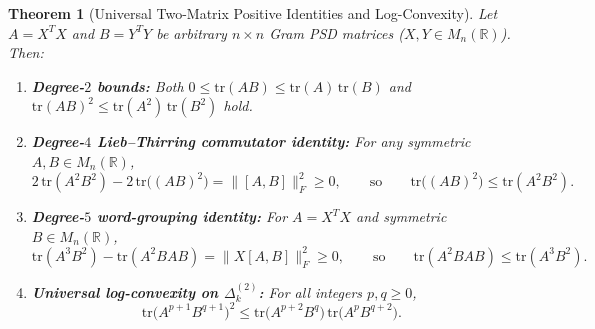 \documentclass[11pt,a4paper]{article}
\newtheorem{theorem}{Theorem}[section]
\theoremstyle{definition}
\theoremstyle{remark}
\newcommand{\tr}{\mathrm{tr}}
\newcommand{\DeltaLat}{\Delta}
\begin{document}
\begin{theorem}[Universal Two-Matrix Positive Identities and Log-Convexity]\label{thm:two-mat}
Let $A = X^T X$ and $B = Y^T Y$ be arbitrary $n \times n$ Gram PSD matrices ($X, Y \in M_n(\mathbb{R})$). Then:
\begin{enumerate}
\item \textbf{Degree-$2$ bounds:} Both $0 \le \tr(AB) \le \tr(A)\,\tr(B)$ and $\tr(AB)^2 \le \tr(A^2)\,\tr(B^2)$ hold.
\item \textbf{Degree-$4$ Lieb--Thirring commutator identity:} For any symmetric $A, B \in M_n(\mathbb{R})$,
\[
2\,\tr(A^2 B^2) - 2\,\tr\bigl((AB)^2\bigr) = \bigl\|[A, B]\bigr\|_F^2 \ge 0,
\qquad\text{so}\qquad \tr\bigl((AB)^2\bigr) \le \tr(A^2 B^2).
\]
\item \textbf{Degree-$5$ word-grouping identity:} For $A = X^T X$ and symmetric $B \in M_n(\mathbb{R})$,
\[
\tr(A^3 B^2) - \tr(A^2 B A B) = \bigl\|X [A, B]\bigr\|_F^2 \ge 0,
\qquad\text{so}\qquad \tr(A^2 B A B) \le \tr(A^3 B^2).
\]
\item \textbf{Universal log-convexity on $\DeltaLat_k^{(2)}$:} For all integers $p, q \ge 0$,
\begin{equation}\label{eq:m2-logconv}
\tr\bigl(A^{p+1} B^{q+1}\bigr)^2 \le \tr\bigl(A^{p+2} B^q\bigr)\,\tr\bigl(A^p B^{q+2}\bigr).
\end{equation}
\end{enumerate}
\end{theorem}
\end{document}
